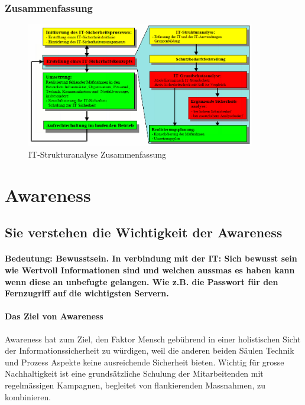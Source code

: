 \documentclass[10pt,a4paper]{article}
\begin{document}
\subsubsection*{Zusammenfassung}
\begin{figure}[H]
    \begin{center}
    \includegraphics[width=10cm]{images/zusammenfassung.png}
    \caption{IT-Strukturanalyse Zusammenfassung}
    \label{IT-Strukturanalyse Zusammenfassung}
    \end{center}
\end{figure}



\section{Awareness}
\subsection*{Sie verstehen die Wichtigkeit der \flqq Awareness \frqq}
\paragraph*{Bedeutung: Bewusstsein. In verbindung mit der IT: Sich bewusst sein wie Wertvoll Informationen sind und welchen aussmas es haben kann wenn diese an unbefugte gelangen. Wie z.B. die Passwort für den Fernzugriff auf die wichtigsten Servern.}
\paragraph*{Das Ziel von Awareness} Awareness hat zum Ziel, den Faktor Mensch gebührend in einer holistischen Sicht der Informationssicherheit zu würdigen, weil die anderen beiden Säulen Technik und Prozess Aspekte keine ausreichende Sicherheit bieten. Wichtig für grosse Nachhaltigkeit ist eine grundsätzliche Schulung der Mitarbeitenden mit regelmässigen Kampagnen, begleitet von flankierenden Massnahmen, zu kombinieren.
\end{document}
